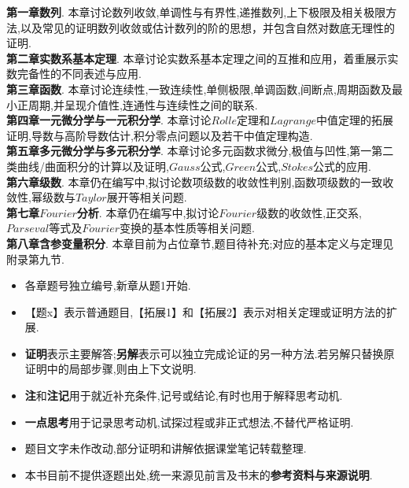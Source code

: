 \documentclass[a4paper,12pt,fleqn,openany,twoside,fontset=windows]{ctexbook}
\begin{document}
\pagestyle{plainnowm}
\begin{booknotelongbody}
\textbf{第一章\quad 数列}. 本章讨论数列收敛,单调性与有界性,递推数列,上下极限及相关极限方法,以及常见的证明数列收敛或估计数列的阶的思想，并包含自然对数底无理性的证明. \\

\textbf{第二章\quad 实数系基本定理}. 本章讨论实数系基本定理之间的互推和应用，着重展示实数完备性的不同表述与应用.\\

\textbf{第三章\quad 函数}. 本章讨论连续性,一致连续性,单侧极限,单调函数,间断点,周期函数及最小正周期,并呈现介值性,连通性与连续性之间的联系.\\

\textbf{第四章\quad 一元微分学与一元积分学}. 本章讨论$Rolle$定理和$Lagrange$中值定理的拓展证明,导数与高阶导数估计,积分零点问题以及若干中值定理构造.\\

\textbf{第五章\quad 多元微分学与多元积分学}. 本章讨论多元函数求微分,极值与凹性,第一第二类曲线/曲面积分的计算以及证明,$Gauss$公式,$Green$公式,$Stokes$公式的应用.\\

\textbf{第六章\quad 级数}. 本章仍在编写中,拟讨论数项级数的收敛性判别,函数项级数的一致收敛性,幂级数与$Taylor$展开等相关问题.\\

\textbf{第七章\quad $Fourier$分析}. 本章仍在编写中,拟讨论$Fourier$级数的收敛性,正交系,$Parseval$等式及$Fourier$变换的基本性质等相关问题.\\

\textbf{第八章\quad 含参变量积分}. 本章目前为占位章节,题目待补充;对应的基本定义与定理见附录第九节.\\

\end{booknotelongbody}
\pagestyle{main}
\clearpage

\pagestyle{plainnowm}
\begin{booknotelongbody}
\begin{itemize}[leftmargin=2\ccwd,itemsep=0.55em,topsep=0pt]
    \item 各章题号独立编号,新章从题1开始.
    \item 【题x】表示普通题目,【拓展1】和【拓展2】表示对相关定理或证明方法的扩展.
    \item \textbf{证明}表示主要解答;\textbf{另解}表示可以独立完成论证的另一种方法.若另解只替换原证明中的局部步骤,则由上下文说明.
    \item \textbf{注}和\textbf{注记}用于就近补充条件,记号或结论,有时也用于解释思考动机.
    \item \textbf{一点思考}用于记录思考动机,试探过程或非正式想法,不替代严格证明.
    \item 题目文字未作改动,部分证明和讲解依据课堂笔记转载整理.
    \item 本书目前不提供逐题出处,统一来源见前言及书末的\textbf{参考资料与来源说明}.
\end{itemize}
\end{booknotelongbody}
\pagestyle{main}
\clearpage
\end{document}
